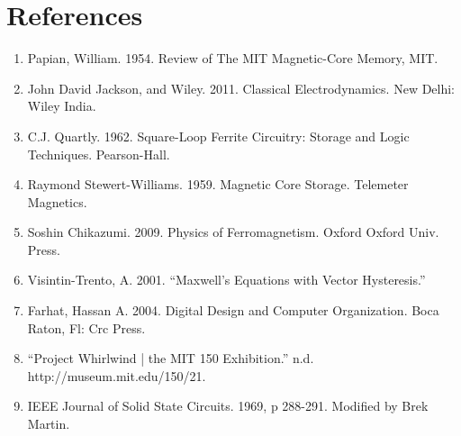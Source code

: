 \documentclass{article}
\begin{document}
\newpage\section{References}
\begin{enumerate}
\item Papian, William. 1954. Review of The MIT Magnetic-Core Memory, MIT.
\item John David Jackson, and Wiley. 2011. Classical Electrodynamics. New Delhi: Wiley India.
\item C.J. Quartly. 1962. Square-Loop Ferrite Circuitry: Storage and Logic Techniques. Pearson-Hall.
\item Raymond Stewert-Williams. 1959. Magnetic Core Storage. Telemeter Magnetics.
\item Soshin Chikazumi. 2009. Physics of Ferromagnetism. Oxford Oxford Univ. Press.
\item Visintin-Trento, A. 2001. “Maxwell’s Equations with Vector Hysteresis.”
\item Farhat, Hassan A. 2004. Digital Design and Computer Organization. Boca Raton, Fl: Crc Press.
\item “Project Whirlwind | the MIT 150 Exhibition.” n.d. http://museum.mit.edu/150/21.
\item IEEE Journal of Solid State Circuits. 1969, p 288-291. Modified by Brek Martin.
\end{enumerate}
\end{document}
